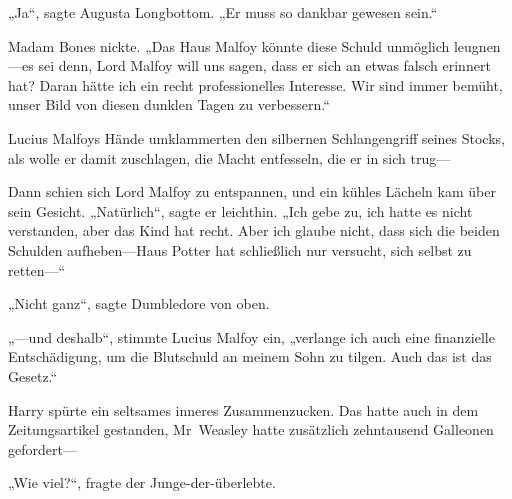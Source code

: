 „Ja“, sagte Augusta Longbottom. „Er muss so dankbar gewesen sein.“

Madam Bones nickte. „Das Haus Malfoy könnte diese Schuld unmöglich leugnen—es sei denn, Lord Malfoy will uns sagen, dass er sich an etwas falsch erinnert hat? Daran hätte ich ein recht professionelles Interesse. Wir sind immer bemüht, unser Bild von diesen dunklen Tagen zu verbessern.“

Lucius Malfoys Hände umklammerten den silbernen Schlangengriff seines Stocks, als wolle er damit zuschlagen, die Macht entfesseln, die er in sich trug—

Dann schien sich Lord Malfoy zu entspannen, und ein kühles Lächeln kam über sein Gesicht. „Natürlich“, sagte er leichthin. „Ich gebe zu, ich hatte es nicht verstanden, aber das Kind hat recht. Aber ich glaube nicht, dass sich die beiden Schulden aufheben—Haus Potter hat schließlich nur versucht, sich selbst zu retten—“

„Nicht ganz“, sagte Dumbledore von oben.

„—und deshalb“, stimmte Lucius Malfoy ein, „verlange ich auch eine finanzielle Entschädigung, um die Blutschuld an meinem Sohn zu tilgen. Auch das ist das Gesetz.“

Harry spürte ein seltsames inneres Zusammenzucken. Das hatte auch in dem Zeitungsartikel gestanden, Mr~Weasley hatte zusätzlich zehntausend Galleonen gefordert—

„Wie viel?“, fragte der Junge-der-überlebte.

